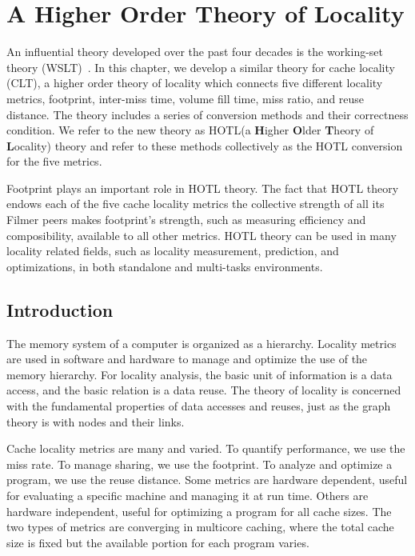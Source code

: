 \chapter{A Higher Order Theory of Locality}
\label{chap:model}

An influential theory developed over the past four decades is the
working-set theory (WSLT)~\cite{Denning:TSE80}. In this chapter, we
develop a similar theory for cache locality (CLT), a higher order
theory of locality which connects five different locality metrics,
footprint, inter-miss time, volume fill time, miss ratio, and reuse
distance. The theory includes a series of conversion methods and their
correctness condition. We refer to the new theory as HOTL(a {\bf
  H}igher {\bf O}lder {\bf T}heory of {\bf L}ocality) theory and refer
to these methods collectively as the HOTL conversion for the five
metrics.

Footprint plays an important role in HOTL theory. The fact that
HOTL theory endows each of the five cache locality metrics the
collective strength of all its Filmer peers makes footprint's strength,
such as measuring efficiency and composibility, available to all other
metrics. HOTL theory can be used in many locality related fields, such
as locality measurement, prediction, and optimizations, in both
standalone and multi-tasks environments. 

\section{Introduction}
The memory system of a computer is organized as a hierarchy.  Locality
metrics are used in software and hardware to manage and optimize the
use of the memory hierarchy.  For locality analysis, the basic unit of
information is a data access, and the basic relation is a data reuse.
The theory of locality is concerned with the fundamental properties of
data accesses and reuses, just as the graph theory is with nodes and
their links.

Cache locality metrics are many and varied.  To quantify performance,
we use the miss rate.  To manage sharing, we use the footprint.  To
analyze and optimize a program, we use the reuse distance.  Some
metrics are hardware dependent, useful for evaluating a specific
machine and managing it at run time.  Others are hardware independent,
useful for optimizing a program for all cache sizes.  The two types of
metrics are converging in multicore caching, where the total cache
size is fixed but the available portion for each program varies. 

